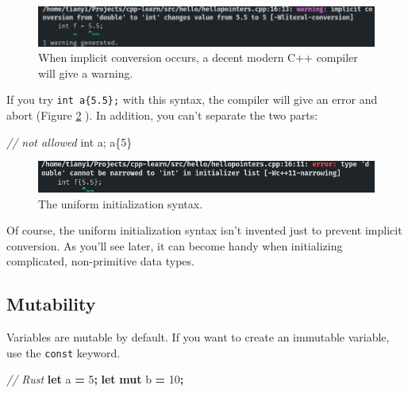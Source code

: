 \documentclass[
]{book}
\newenvironment{Shaded}{\begin{snugshade}}{\end{snugshade}}
\newcommand{\CommentTok}[1]{\textcolor[rgb]{0.56,0.35,0.01}{\textit{#1}}}
\newcommand{\DataTypeTok}[1]{\textcolor[rgb]{0.13,0.29,0.53}{#1}}
\newcommand{\DecValTok}[1]{\textcolor[rgb]{0.00,0.00,0.81}{#1}}
\newcommand{\KeywordTok}[1]{\textcolor[rgb]{0.13,0.29,0.53}{\textbf{#1}}}
\newcommand{\NormalTok}[1]{#1}
\newcommand{\OperatorTok}[1]{\textcolor[rgb]{0.81,0.36,0.00}{\textbf{#1}}}
\begin{document}
\begin{figure}
\centering
\includegraphics{img/equal.png}
\caption{\label{fig:equal}When implicit conversion occurs, a decent modern C++ compiler will give a warning.}
\end{figure}

If you try \texttt{int\ a\{5.5\};} with this syntax, the compiler will give an error and abort (Figure \ref{fig:braces} ). In addition, you can't separate the two parts:

\begin{Shaded}
\begin{Highlighting}[]
\CommentTok{// not allowed}
\DataTypeTok{int}\NormalTok{ a;}
\NormalTok{a\{}\DecValTok{5}\NormalTok{\}}
\end{Highlighting}
\end{Shaded}

\begin{figure}
\centering
\includegraphics{img/brace.png}
\caption{\label{fig:braces}The uniform initialization syntax.}
\end{figure}

Of course, the uniform initialization syntax isn't invented just to prevent implicit conversion. As you'll see later, it can become handy when initializing complicated, non-primitive data types.

\hypertarget{mutability}{%
\subsection{Mutability}\label{mutability}}

Variables are mutable by default. If you want to create an immutable variable, use the \texttt{const} keyword.

\begin{Shaded}
\begin{Highlighting}[]
\CommentTok{// Rust}
\KeywordTok{let}\NormalTok{ a }\OperatorTok{=} \DecValTok{5}\OperatorTok{;}
\KeywordTok{let} \KeywordTok{mut}\NormalTok{ b }\OperatorTok{=} \DecValTok{10}\OperatorTok{;}
\end{Highlighting}
\end{Shaded}
\end{document}
